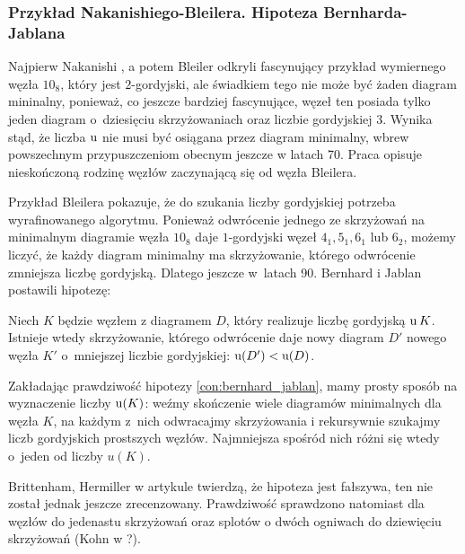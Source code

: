 
\subsubsection{Przykład Nakanishiego-Bleilera. Hipoteza Bernharda-Jablana}
Najpierw Nakanishi \cite{nakanishi83}, a potem Bleiler \cite{bleiler84} odkryli fascynujący przykład wymiernego węzła $10_8$, który jest $2$-gordyjski, ale świadkiem tego nie może być żaden diagram mininalny, ponieważ, co jeszcze bardziej fascynujące, węzeł ten posiada tylko jeden diagram o~dziesięciu skrzyżowaniach oraz liczbie gordyjskiej 3.
%
%
Wynika stąd, że liczba $\operatorname{u}$ nie musi być osiągana przez diagram minimalny, wbrew powszechnym przypuszczeniom obecnym jeszcze w latach 70.
Praca \cite{bernhard94} opisuje nieskończoną rodzinę węzłów zaczynającą się od węzła Bleilera.

Przykład Bleilera pokazuje, że do szukania liczby gordyjskiej potrzeba wyrafinowanego algorytmu.
Ponieważ odwrócenie jednego ze skrzyżowań na minimalnym diagramie węzła $10_8$ daje $1$-gordyjski węzeł $4_1, 5_1, 6_1$ lub $6_2$, możemy liczyć, że każdy diagram minimalny ma skrzyżowanie, którego odwrócenie zmniejsza liczbę gordyjską.
Dlatego jeszcze w~latach 90. Bernhard \cite{bernhard94} i Jablan \cite{jablan98} postawili hipotezę:

\begin{conjecture}
%
%
%
\label{con:bernhard_jablan}%
    Niech $K$ będzie węzłem z diagramem $D$, który realizuje liczbę gordyjską $\operatorname{u} K$.
    Istnieje wtedy skrzyżowanie, którego odwrócenie daje nowy diagram $D'$ nowego węzła $K'$ o~mniejszej liczbie gordyjskiej: $\operatorname{u} (D') < \operatorname{u} (D)$.
\end{conjecture}

Zakładając prawdziwość hipotezy \ref{con:bernhard_jablan}, mamy prosty sposób na wyznaczenie liczby $\operatorname{u} (K)$: weźmy skończenie wiele diagramów minimalnych dla węzła $K$, na każdym z~nich odwracajmy skrzyżowania i rekursywnie szukajmy liczb gordyjskich prostszych węzłów.
Najmniejsza spośród nich różni się wtedy o~jeden od liczby $u(K)$.

Brittenham, Hermiller w artykule \cite{brittenham17} twierdzą, że hipoteza jest fałszywa, ten nie został jednak jeszcze zrecenzowany.
%
%
Prawdziwość sprawdzono natomiast dla węzłów do jedenastu skrzyżowań oraz splotów o dwóch ogniwach do dziewięciu skrzyżowań (Kohn w \cite{kohn93}?).
%

